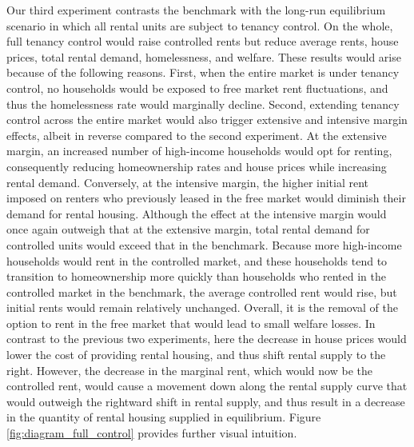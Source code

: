 \documentclass[parskip=full]{article}
\begin{document}
Our third experiment contrasts the benchmark with the long-run equilibrium scenario in which all rental units are subject to tenancy control. On the whole, full tenancy control would raise controlled rents but reduce average rents, house prices, total rental demand, homelessness, and welfare. These results would arise because of the following reasons. First, when the entire market is under tenancy control, no households would be exposed to free market rent fluctuations, and thus the homelessness rate would marginally decline. Second, extending tenancy control across the entire market would also trigger extensive and intensive margin effects, albeit in reverse compared to the second experiment. At the extensive margin, an increased number of high-income households would opt for renting, consequently reducing homeownership rates and house prices while increasing rental demand. Conversely, at the intensive margin, the higher initial rent imposed on renters who previously leased in the free market would diminish their demand for rental housing. Although the effect at the intensive margin would once again outweigh that at the extensive margin, total rental demand for controlled units would exceed that in the benchmark. Because more high-income households would rent in the controlled market, and these households tend to transition to homeownership more quickly than households who rented in the controlled market in the benchmark, the average controlled rent would rise, but initial rents would remain relatively unchanged. Overall, it is the removal of the option to rent in the free market that would lead to small welfare losses. In contrast to the previous two experiments, here the decrease in house prices would lower the cost of providing rental housing, and thus shift rental supply to the right. However, the decrease in the marginal rent, which would now be the controlled rent, would cause a movement down along the rental supply curve that would outweigh the rightward shift in rental supply, and thus result in a decrease in the quantity of rental housing supplied in equilibrium. Figure \ref{fig:diagram_full_control} provides further visual intuition.
\end{document}
